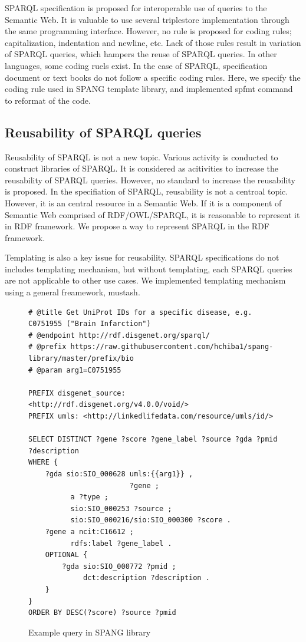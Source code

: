 \documentclass[runningheads]{llncs}
\begin{document}
SPARQL specification is proposed for interoperable use of queries to the Semantic Web. It is valuable to use several triplestore implementation through the same programming interface. However, no rule is proposed for coding rules; capitalization, indentation and newline, etc. Lack of those rules result in variation of SPARQL queries, which hampers the reuse of SPARQL queries. In other languages, some coding ruels exist. In the case of SPARQL, specification document or text books do not follow a specific coding rules. Here, we specify the coding rule used in SPANG template library, and implemented spfmt command to reformat of the code.

\subsection{Reusability of SPARQL queries}
Reusability of SPARQL is not a new topic. Various activity is conducted to construct libraries of SPARQL. It is considered as acitivities to increase the reusability of SPARQL queries. However, no standard to increase the reusability is proposed. In the specifiation of SPARQL, reusability is not a centroal topic. However, it is an central resource in a Semantic Web. If it is a component of Semantic Web comprised of RDF/OWL/SPARQL, it is reasonable to represent it in RDF framework. We propose a way to represent SPARQL in the RDF framework.

Templating is also a key issue for reusability. SPARQL specifications do not includes templating mechanism, but without templating, each SPARQL queries are not applicable to other use cases. We implemented templating mechanism using a general freamework, mustash.




\begin{figure}[!t]
\begin{scriptsize}
\begin{verbatim}
# @title Get UniProt IDs for a specific disease, e.g. C0751955 ("Brain Infarction")
# @endpoint http://rdf.disgenet.org/sparql/
# @prefix https://raw.githubusercontent.com/hchiba1/spang-library/master/prefix/bio
# @param arg1=C0751955 

PREFIX disgenet_source: <http://rdf.disgenet.org/v4.0.0/void/>
PREFIX umls: <http://linkedlifedata.com/resource/umls/id/>

SELECT DISTINCT ?gene ?score ?gene_label ?source ?gda ?pmid ?description
WHERE {
    ?gda sio:SIO_000628 umls:{{arg1}} ,
                        ?gene ;
          a ?type ;
          sio:SIO_000253 ?source ;
          sio:SIO_000216/sio:SIO_000300 ?score .
    ?gene a ncit:C16612 ;
          rdfs:label ?gene_label .
    OPTIONAL {
        ?gda sio:SIO_000772 ?pmid ;
             dct:description ?description .
    }
}
ORDER BY DESC(?score) ?source ?pmid

\end{verbatim}
\end{scriptsize}
\caption{Example query in SPANG library}
\label{fig:example-rdf}
\end{figure}
\end{document}
